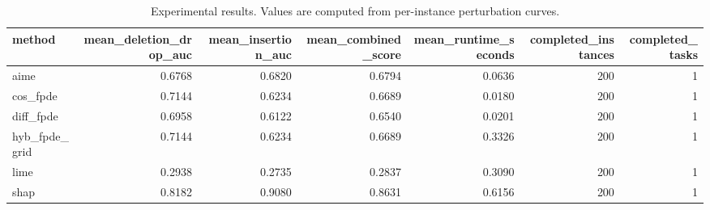 \begin{table}[t]
\caption{Experimental results. Values are computed from per-instance perturbation curves.}
\label{tab:main_results_computed}
\centering
\begin{tabular}{lrrrrrr}
\toprule
method & mean\_deletion\_drop\_auc & mean\_insertion\_auc & mean\_combined\_score & mean\_runtime\_seconds & completed\_instances & completed\_tasks \\
\midrule
aime & 0.6768 & 0.6820 & 0.6794 & 0.0636 & 200 & 1 \\
cos\_fpde & 0.7144 & 0.6234 & 0.6689 & 0.0180 & 200 & 1 \\
diff\_fpde & 0.6958 & 0.6122 & 0.6540 & 0.0201 & 200 & 1 \\
hyb\_fpde\_grid & 0.7144 & 0.6234 & 0.6689 & 0.3326 & 200 & 1 \\
lime & 0.2938 & 0.2735 & 0.2837 & 0.3090 & 200 & 1 \\
shap & 0.8182 & 0.9080 & 0.8631 & 0.6156 & 200 & 1 \\
\bottomrule
\end{tabular}

\end{table}
